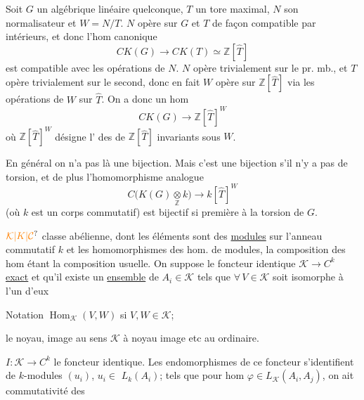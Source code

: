Soit $G$ un   algébrique linéaire quelconque,
$T$ un tore maximal, $N$ son normalisateur et $W=N/T$.
 $N$ opère sur $G$ et $T$ de façon compatible par
 intérieurs, et  donc  l'hom canonique
\[ CK(G)\longrightarrow CK(T)\simeq\mathbb Z[\widehat T] \]
est compatible avec les opérations de $N$. $N$ opère
trivialement sur le pr. mb., et $T$ opère trivialement
sur le second, donc en fait $W$ opère sur
$\mathbb Z[\widehat T]$ via les opérations de $W$ sur $\widehat T$. On
a donc un hom
\[ CK(G)\longrightarrow\mathbb Z[\widehat T]^W \tag*{(5)} \]
où $\mathbb Z[\widehat T]^W$ désigne l' des  de
$\mathbb Z[\widehat T]$ invariants sous $W$.

 En général  on n'a
pas là une bijection. Mais c'est  une bijection
s'il n'y a pas de torsion,  et de
plus l'homomorphisme analogue
\[ C\bigl(K(G)\mathbin{\underset{\mathbb Z}{\otimes}}k\bigr)\longrightarrow k[\widehat T]^W \tag*{(5 bis)} \]
(où $k$ est un corps commutatif) est bijectif
si   première à la torsion de $G$.

$\unsure{\mathcal K|K|\mathcal C}$ classe abélienne,  dont les éléments sont des
 \uline{modules} sur l'anneau commutatif $k$
et les homomorphismes des hom. de modules,
la composition des hom étant la composition usuelle.
On suppose le foncteur identique $\mathcal K\longrightarrow C^{k}$ \uline{exact}
et qu'il existe un \uline{ensemble} de $A_i\in\mathcal K$ tels
que $\forall\,V\in\mathcal K$ soit isomorphe à l'un d'eux

Notation $\operatorname{Hom}_{\mathcal K}(V,W)$ si $V,W\in\mathcal K$;

le noyau, image  au sens $\mathcal K$  à noyau
image etc au   ordinaire.

 $I:\mathcal K\longrightarrow C^k$ le foncteur identique. Les endomorphismes
de ce foncteur s'identifient 
 de $k$-modules $(u_i)$, $u_i\in$
$L_k(A_i)$; tels que pour  hom
$\varphi\in L_{\mathcal K}(A_i,A_j)$, on ait commutativité
des

